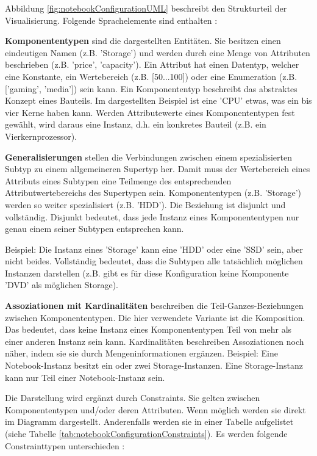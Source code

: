 \documentclass[11pt, a4paper, titlepage, listof=totoc, bibliography=totoc, index=totoc, twoside, openright, headings=normal, draft]{scrreprt}
\begin{document}
Abbildung \ref{fig:notebookConfigurationUML} beschreibt den Strukturteil der Visualisierung. Folgende Sprachelemente sind enthalten \citep{felferning14}:
\begin{compactitem}
\item\textbf{Komponententypen} sind die dargestellten Entitäten. Sie besitzen einen eindeutigen Namen (z.B. 'Storage') und werden durch eine Menge von Attributen beschrieben (z.B. 'price', 'capacity'). Ein Attribut hat einen Datentyp, welcher eine Konstante, ein Wertebereich (z.B. [50...100]) oder eine Enumeration (z.B. ['gaming', 'media']) sein kann. Ein Komponententyp beschreibt das abstraktes Konzept eines Bauteils. Im dargestellten Beispiel ist eine 'CPU' etwas, was ein bis vier Kerne haben kann. Werden Attributewerte eines Komponententypen fest gewählt, wird daraus eine Instanz, d.h. ein konkretes Bauteil (z.B. ein Vierkernprozessor).
\item \textbf{Generalisierungen} stellen die Verbindungen zwischen einem spezialisierten Subtyp zu einem allgemeineren Supertyp her. Damit muss der Wertebereich eines Attributs eines Subtypen eine Teilmenge des entsprechenden Attributwertebereichs des Supertypen sein. Komponententypen (z.B. 'Storage') werden so weiter spezialisiert (z.B. 'HDD'). Die Beziehung ist disjunkt und vollständig. Disjunkt bedeutet, dass jede Instanz eines Komponententypen nur genau einem seiner Subtypen entsprechen kann.\vspace{0.3em}

Beispiel: Die Instanz eines 'Storage' kann eine 'HDD' oder eine 'SSD' sein, aber nicht beides. Vollständig bedeutet, dass die Subtypen alle tatsächlich möglichen Instanzen darstellen (z.B. gibt es für diese Konfiguration keine Komponente 'DVD' als möglichen Storage).
\item \textbf{Assoziationen mit Kardinalitäten} beschreiben die Teil-Ganzes-Beziehungen zwischen Komponententypen. Die hier verwendete Variante ist die Komposition. Das bedeutet, dass keine Instanz eines Komponententypen Teil von mehr als einer anderen Instanz sein kann. Kardinalitäten beschreiben Assoziationen noch näher, indem sie sie durch Mengeninformationen ergänzen. Beispiel: Eine Notebook-Instanz besitzt ein oder zwei Storage-Instanzen. Eine Storage-Instanz kann nur Teil einer Notebook-Instanz sein.
\end{compactitem}

Die Darstellung wird ergänzt durch Constraints. Sie gelten zwischen Komponententypen und/oder deren Attributen. Wenn möglich werden sie direkt im Diagramm dargestellt. Anderenfalls werden sie in einer Tabelle aufgelistet (siehe Tabelle \ref{tab:notebookConfigurationConstraints}). Es werden folgende Constrainttypen unterschieden \citep{felferning14}:
\end{document}
